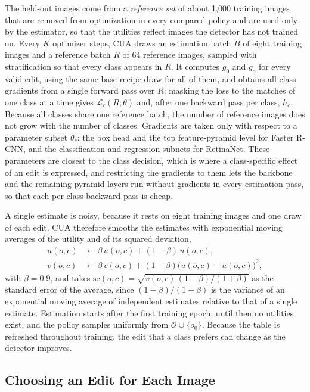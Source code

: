 \documentclass[conference]{IEEEtran}
\begin{document}
The held-out images come from a \emph{reference set} of about 1,000 training images that are removed from optimization in every compared policy and are used only by the estimator, so that the utilities reflect images the detector has not trained on. Every $K$ optimizer steps, CUA draws an estimation batch $B$ of eight training images and a reference batch $R$ of 64 reference images, sampled with stratification so that every class appears in $R$. It computes $g_0$ and $g_o$ for every valid edit, using the same base-recipe draw for all of them, and obtains all class gradients from a single forward pass over $R$: masking the loss to the matches of one class at a time gives $\mathcal{L}_c(R;\theta)$ and, after one backward pass per class, $h_c$. Because all classes share one reference batch, the number of reference images does not grow with the number of classes. Gradients are taken only with respect to a parameter subset $\theta_s$: the box head and the top feature-pyramid level for Faster R-CNN, and the classification and regression subnets for RetinaNet. These parameters are closest to the class decision, which is where a class-specific effect of an edit is expressed, and restricting the gradients to them lets the backbone and the remaining pyramid layers run without gradients in every estimation pass, so that each per-class backward pass is cheap.

A single estimate is noisy, because it rests on eight training images and one draw of each edit. CUA therefore smooths the estimates with exponential moving averages of the utility and of its squared deviation,
\begin{align}
\bar u(o,c)&\leftarrow\beta\,\bar u(o,c)+(1-\beta)\,u(o,c),\label{eq:ema}\\
v(o,c)&\leftarrow\beta\,v(o,c)+(1-\beta)\bigl(u(o,c)-\bar u(o,c)\bigr)^2,\label{eq:var}
\end{align}
with $\beta=0.9$, and takes $\mathrm{se}(o,c)=\sqrt{v(o,c)\,(1-\beta)/(1+\beta)}$ as the standard error of the average, since $(1-\beta)/(1+\beta)$ is the variance of an exponential moving average of independent estimates relative to that of a single estimate. Estimation starts after the first training epoch; until then no utilities exist, and the policy samples uniformly from $\mathcal{O}\cup\{o_0\}$. Because the table is refreshed throughout training, the edit that a class prefers can change as the detector improves.

\subsection{Choosing an Edit for Each Image}
\label{sec:method_policy}
\end{document}
